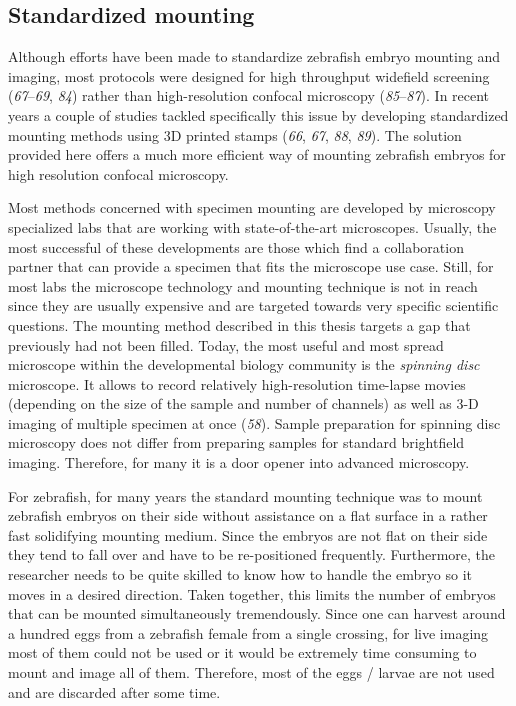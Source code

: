 \documentclass[10pt, b5paper, singlespacinge, twoside]{reedthesis} %
\theoremstyle{definition}
\theoremstyle{definition}
\theoremstyle{definition}
\theoremstyle{remark}
\begin{document}
\hypertarget{standardized-mounting}{%
\subsection{Standardized mounting}\label{standardized-mounting}}

Although efforts have been made to standardize zebrafish embryo mounting and imaging, most protocols were designed for high throughput widefield screening (\emph{67}--\emph{69}, \emph{84}) rather than high-resolution confocal microscopy (\emph{85}--\emph{87}). In recent years a couple of studies tackled specifically this issue by developing standardized mounting methods using 3D printed stamps (\emph{66}, \emph{67}, \emph{88}, \emph{89}). The solution provided here offers a much more efficient way of mounting zebrafish embryos for high resolution confocal microscopy.

Most methods concerned with specimen mounting are developed by microscopy specialized labs that are working with state-of-the-art microscopes. Usually, the most successful of these developments are those which find a collaboration partner that can provide a specimen that fits the microscope use case. Still, for most labs the microscope technology and mounting technique is not in reach since they are usually expensive and are targeted towards very specific scientific questions. The mounting method described in this thesis targets a gap that previously had not been filled. Today, the most useful and most spread microscope within the developmental biology community is the \emph{spinning disc} microscope. It allows to record relatively high-resolution time-lapse movies (depending on the size of the sample and number of channels) as well as 3-D imaging of multiple specimen at once (\emph{58}). Sample preparation for spinning disc microscopy does not differ from preparing samples for standard brightfield imaging. Therefore, for many it is a door opener into advanced microscopy.

For zebrafish, for many years the standard mounting technique was to mount zebrafish embryos on their side without assistance on a flat surface in a rather fast solidifying mounting medium. Since the embryos are not flat on their side they tend to fall over and have to be re-positioned frequently. Furthermore, the researcher needs to be quite skilled to know how to handle the embryo so it moves in a desired direction. Taken together, this limits the number of embryos that can be mounted simultaneously tremendously. Since one can harvest around a hundred eggs from a zebrafish female from a single crossing, for live imaging most of them could not be used or it would be extremely time consuming to mount and image all of them. Therefore, most of the eggs / larvae are not used and are discarded after some time.
\end{document}
